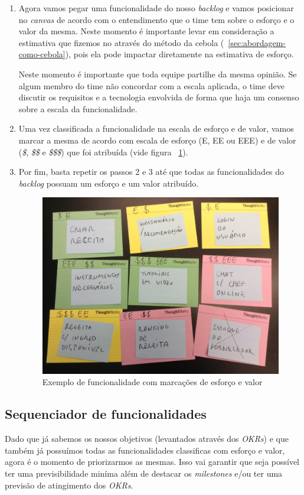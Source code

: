 \documentclass[10pt]{article}
\begin{document}
\begin{enumerate}
                \item Agora vamos pegar uma funcionalidade do nosso \textit{backlog} e vamos posicionar no \textit{canvas} de acordo com o entendimento que o time tem sobre o esforço e o valor da mesma. Neste momento é importante levar em consideração a estimativa que fizemos no através do método da cebola (~\ref{sec:abordagem-como-cebola}), pois ela pode impactar diretamente na estimativa de esforço.
                
                Neste momento é importante que toda equipe partilhe da mesma opinião. Se algum membro do time não concordar com a escala aplicada, o time deve discutir os requisitos e a tecnologia envolvida de forma que haja um consenso sobre a escala da funcionalidade.
                
                \item Uma vez classificada a funcionalidade na escala de esforço e de valor, vamos marcar a mesma de acordo com escala de esforço (E, EE ou EEE) e de valor (\textit{\$}, \textit{\$\$} e \textit{\$\$\$}) que foi atribuída (vide figura ~\ref{figura:6}).
                
                \item Por fim, basta repetir os passos 2 e 3 até que todas as funcionalidades do \textit{backlog} possuam um esforço e um valor atribuído.
                
                \begin{figure}[H]
            		\centering
            		\includegraphics[width=.5\textwidth]{images/canvas-esforco-valor-2.jpg}
            		\caption{Exemplo de funcionalidade com marcações de esforço e valor}
            		\label{figura:6}
            	\end{figure}
            \end{enumerate}
        


        \subsection{Sequenciador de funcionalidades}\label{sec:abordagem-como-sequenciador}
            Dado que já sabemos os nossos objetivos (levantados através dos \textit{OKRs}) e que também já possuímos todas as funcionalidades classificas com esforço e valor, agora é o momento de priorizarmos as mesmas. Isso vai garantir que seja possível ter uma previsibilidade miníma além de destacar os \textit{milestones} e/ou ter uma previsão de atingimento dos \textit{OKRs}.
            
\end{document}
